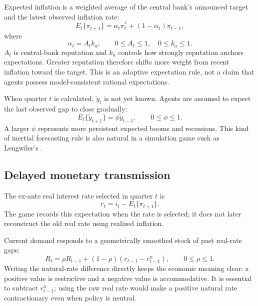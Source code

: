 \documentclass[11pt]{article}
\newcommand{\gap}{\widetilde y}
\newcommand{\pistar}{\pi^{*}}
\begin{document}
Expected inflation is a weighted average of the central bank's announced
target and the latest observed inflation rate:
\begin{equation}
  E_t\{\pi_{t+1}\}=\alpha_t\pistar_t+(1-\alpha_t)\pi_{t-1},
  \label{eq:inflation-expectations}
\end{equation}
where
\begin{equation}
  \alpha_t=A_t k_a,
  \qquad 0\leq A_t\leq1,\quad 0\leq k_a\leq1.
  \label{eq:expectation-weight}
\end{equation}
$A_t$ is central-bank reputation and $k_a$ controls how strongly reputation
anchors expectations.  Greater reputation therefore shifts more weight from
recent inflation toward the target.  This is an adaptive expectation rule, not
a claim that agents possess model-consistent rational expectations.

When quarter $t$ is calculated, $\gap_t$ is not yet known.  Agents are assumed
to expect the last observed gap to close gradually:
\begin{equation}
  E_t\{\gap_{t+1}\}=\phi\gap_{t-1},
  \qquad 0\leq\phi\leq1.
  \label{eq:output-gap-expectations}
\end{equation}
A larger $\phi$ represents more persistent expected booms and recessions.  This
kind of inertial forecasting rule is also natural in a simulation game such as
Lengwiler's \cite{lengwiler2004}.

\subsection{Delayed monetary transmission}

The ex-ante real interest rate selected in quarter $t$ is
\begin{equation}
  r_t=i_t-E_t\{\pi_{t+1}\}.
  \label{eq:real-rate}
\end{equation}
The game records this expectation when the rate is selected; it does not later
reconstruct the old real rate using realized inflation.

Current demand responds to a geometrically smoothed stock of past real-rate
gaps:
\begin{equation}
  R_t=\rho R_{t-1}
  +(1-\rho)(r_{t-1}-r^n_{t-1}),
  \qquad 0\leq\rho\leq1.
  \label{eq:effective-real-rate-gap}
\end{equation}
Writing the natural-rate difference directly keeps the economic meaning clear:
a positive value is restrictive and a negative value is accommodative.  It is
essential to subtract $r^n_{t-1}$; using the raw real rate would make a positive
natural rate contractionary even when policy is neutral.
\end{document}
